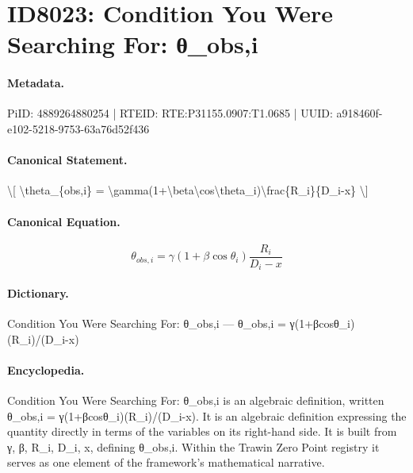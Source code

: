\section*{ID8023: Condition You Were Searching For: θ\_obs,i}
\paragraph{Metadata.}
PiID: 4889264880254 | RTEID: RTE:P31155.0907:T1.0685 | UUID: a918460f-e102-5218-9753-63a76d52f436

\paragraph{Canonical Statement.}
\textbackslash{}[ \textbackslash{}theta\_\{obs,i\} = \textbackslash{}gamma(1+\textbackslash{}beta\textbackslash{}cos\textbackslash{}theta\_i)\textbackslash{}frac\{R\_i\}\{D\_i-x\} \textbackslash{}]

\paragraph{Canonical Equation.}
\[
\theta_{obs,i} = \gamma(1+\beta\cos\theta_i)\frac{R_i}{D_i-x}
\]

\paragraph{Dictionary.}
Condition You Were Searching For: θ\_obs,i — θ\_obs,i = γ(1+βcosθ\_i)(R\_i)/(D\_i-x)

\paragraph{Encyclopedia.}
Condition You Were Searching For: θ\_obs,i is an algebraic definition, written θ\_obs,i = γ(1+βcosθ\_i)(R\_i)/(D\_i-x). It is an algebraic definition expressing the quantity directly in terms of the variables on its right-hand side. It is built from γ, β, R\_i, D\_i, x, defining θ\_obs,i. Within the Trawin Zero Point registry it serves as one element of the framework's mathematical narrative.
